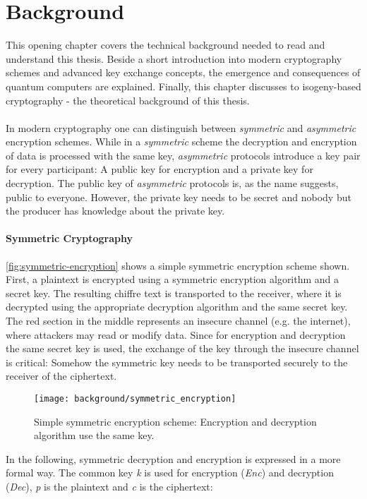 \chapter{Background}\label{chapter:background}
This opening chapter covers the technical background needed to read and understand this thesis. Beside a short introduction into modern cryptography schemes and advanced key exchange concepts, the emergence and consequences of quantum computers are explained. Finally, this chapter discusses to isogeny-based cryptography - the theoretical background of this thesis.
\\\\
In modern cryptography one can distinguish between \textit{symmetric} and \textit{asymmetric} encryption schemes. While in a \textit{symmetric} scheme the decryption and encryption of data is processed with the same key, \textit{asymmetric} protocols introduce a key pair for every participant: A public key for encryption and a private key for decryption. The public key of \textit{asymmetric} protocols is, as the name suggests, public to everyone. However, the private key needs to be secret and nobody but the producer has knowledge about the private key.

\subsubsection{Symmetric Cryptography}

\autoref{fig:symmetric-encryption} shows a simple symmetric encryption scheme shown. First, a plaintext is encrypted using a symmetric encryption algorithm and a secret key. The resulting chiffre text is transported to the receiver, where it is decrypted using the appropriate decryption algorithm and the same secret key. The red section in the middle represents an insecure channel (e.g. the internet), where attackers may read or modify data. Since for encryption and decryption the same secret key is used, the exchange of the key through the insecure channel is critical: Somehow the symmetric key needs to be transported securely to the receiver of the ciphertext.

\begin{figure}[htpb]
  \centering
  \texttt{[image: background/symmetric\_encryption]}
  \caption[Symmetric encryption scheme]{Simple symmetric encryption scheme: Encryption and decryption algorithm use the same key.} \label{fig:symmetric-encryption}
\end{figure}
In the following, symmetric decryption and encryption is expressed in a more formal way. The common key \textit{k} is used for encryption (\textit{Enc}) and decryption (\textit{Dec}), \textit{p} is the plaintext and \textit{c} is the ciphertext:

